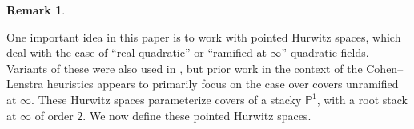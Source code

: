\documentclass[12 pt]{amsart}
\theoremstyle{plain}
\theoremstyle{definition}
\newtheorem{remark}[theorem]{Remark}
\theoremstyle{remark}
\numberwithin{equation}{section}
\DeclareMathOperator\spec{Spec}
\newcommand{\hur}[4]{[\operatorname{Hur}^{#1, #3}_{#2,#4}/#1]}
\begin{document}
\begin{remark}
%
\end{remark}

One important idea in this paper is to work with pointed Hurwitz spaces, which deal with the case of
``real quadratic'' or ``ramified at $\infty$'' quadratic fields. 
Variants of these were also used in \cite{ellenbergL:homological-stability-for-generalized-hurwitz-spaces},
but prior work in the context of the Cohen--Lenstra heuristics appears to
primarily focus on the case over covers unramified at $\infty$.
These Hurwitz spaces parameterize covers of a stacky $\mathbb P^1$, with a root
stack at $\infty$ of order $2$.
We now define these pointed Hurwitz spaces.
\end{document}
